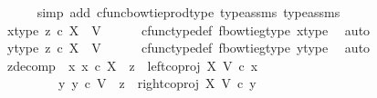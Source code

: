 \begin{isabellebody}
\ \ \ \ \isamarkupfalse%
\ {\isacharparenleft}{\kern0pt}simp\ add{\isacharcolon}{\kern0pt}\ cfunc{\isacharunderscore}{\kern0pt}bowtie{\isacharunderscore}{\kern0pt}prod{\isacharunderscore}{\kern0pt}type\ type{\isacharunderscore}{\kern0pt}assms{\isacharparenleft}{\kern0pt}{}{\isacharparenright}{\kern0pt}\ type{\isacharunderscore}{\kern0pt}assms{\isacharparenleft}{\kern0pt}{}{\isacharparenright}{\kern0pt}{\isacharparenright}{\kern0pt}\isanewline
\isanewline
\ \ \isamarkupfalse%
\ x{\isacharunderscore}{\kern0pt}type{}{\isacharcolon}{\kern0pt}\ {\isachardoublequoteopen}z{}\ {\isasymin}\isactrlsub c\ X\ {\isasymCoprod}\ V{\isachardoublequoteclose}\isanewline
\ \ \ \ \isamarkupfalse%
\ cfunc{\isacharunderscore}{\kern0pt}type{\isacharunderscore}{\kern0pt}def\ f{\isacharunderscore}{\kern0pt}bowtie{\isacharunderscore}{\kern0pt}g{\isacharunderscore}{\kern0pt}type\ x{\isacharunderscore}{\kern0pt}type\ \isamarkupfalse%
\ auto\isanewline
\ \ \isamarkupfalse%
\ y{\isacharunderscore}{\kern0pt}type{}{\isacharcolon}{\kern0pt}\ {\isachardoublequoteopen}z{}\ {\isasymin}\isactrlsub c\ X\ {\isasymCoprod}\ V{\isachardoublequoteclose}\isanewline
\ \ \ \ \isamarkupfalse%
\ cfunc{\isacharunderscore}{\kern0pt}type{\isacharunderscore}{\kern0pt}def\ f{\isacharunderscore}{\kern0pt}bowtie{\isacharunderscore}{\kern0pt}g{\isacharunderscore}{\kern0pt}type\ y{\isacharunderscore}{\kern0pt}type\ \isamarkupfalse%
\ auto\isanewline
\isanewline
\ \ \isamarkupfalse%
\ z{}{\isacharunderscore}{\kern0pt}decomp{\isacharcolon}{\kern0pt}\ {\isachardoublequoteopen}{\isacharparenleft}{\kern0pt}{\isasymexists}\ x{}{\isachardot}{\kern0pt}\ {\isacharparenleft}{\kern0pt}x{}\ {\isasymin}\isactrlsub c\ X\ {\isasymand}\ z{}\ {\isacharequal}{\kern0pt}\ left{\isacharunderscore}{\kern0pt}coproj\ X\ V\ {\isasymcirc}\isactrlsub c\ x{}{\isacharparenright}{\kern0pt}{\isacharparenright}{\kern0pt}\isanewline
\ \ \ \ \ \ {\isasymor}\ \ {\isacharparenleft}{\kern0pt}{\isasymexists}\ y{}{\isachardot}{\kern0pt}\ {\isacharparenleft}{\kern0pt}y{}\ {\isasymin}\isactrlsub c\ V\ {\isasymand}\ z{}\ {\isacharequal}{\kern0pt}\ right{\isacharunderscore}{\kern0pt}coproj\ X\ V\ {\isasymcirc}\isactrlsub c\ y{}{\isacharparenright}{\kern0pt}{\isacharparenright}{\kern0pt}{\isachardoublequoteclose}\isanewline
\ \ \ \ \isamarkupfalse%

\end{isabellebody}
